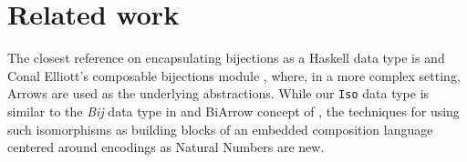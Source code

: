 \documentclass[]{INCLUDES/llncs}
\begin{document}
\begin{comment}
Assuming morphisms are given by their positions {\tt m1} and {\tt m2} in the
multidigraph (sequence of pairs) representing the category {\tt c} encoded by
natural number {\tt n} we can define:
\begin{code}
ncompose n m1 m2 = as nat nat2 m where 
  c=as mdigraph nat n
  m=pcompose (c!!m1) (c!!m2)
\end{code}
which works as follows:
\begin{codex}
*ISO> as mdigraph nat 1234567890
[(1,0),(0,1),(1,0),(0,0),(1,0),(3,1),
 (0,0),(1,0),(0,1),(0,0),(0,1),(0,1)]
*ISO> pcompose (3,1) (1,0)
(3,0)
*ISO> ncompose 1234567890 5 2
5
*ISO> ncompose 1234567890 2 5
*** Exception: pcompose: bad morphisms
\end{codex}
The function {\tt trans} computes the irreflexive transitive closure of a
digraph while {\tt rtrans} adds identity pairs to it.
\begin{code}
rtrans ps = (ids ps) ++ (trans ps)

trans ps = sort $ nub $ trans2 ps where

  trans1 ps = nub [q|q<-qs,not (is_id q)] where
     is_id (x,y) = x==y 
     qs=ps++[pcompose p q|p<-ps,q<-ps,is_pcomposable p q]

  trans2 ps = if (l==l1) then ps else (trans2 ps1) where
    l=genericLength ps 
    ps1=trans1 ps
    l1=genericLength ps1
\end{code}
It works as follows:
\begin{codex}
*ISO> trans [(0,1),(1,2),(2,3)]
[(0,1),(0,2),(0,3),(1,2),(1,3),(2,3)]
*ISO> trans [(0,1),(1,2),(2,0)]
[(0,1),(0,2),(1,0),(1,2),(2,0),(2,1)]
*ISO> rtrans [(0,1),(1,2)]
[(0,0),(1,1),(2,2),(0,1),(0,2),(1,2)]
\end{codex}

\begin{code}
to_trans n = trans $ as digraph nat n

ntrans n = as nat digraph $ to_trans n

vertset ps = sort $ nub [z|(x,y)<-ps,z<-[x,y]]

ids ps = [(x,x)|x<-vertset ps]

pairs2graph ps = l where
  l=genericLength ps
  
gtest = map f (vertices x) where 
  (x,f,z)=graphFromEdges [(0,10,[10,20]),(1,10,[20]),(2,20,[10])]
  
\end{code}
\end{comment}

\section{Related work} \label{related}
The closest reference on encapsulating bijections
as a Haskell data type is \cite{bijarrows} 
and Conal Elliott's composable
bijections module \cite{bijeliot},
where, in a more complex setting,
Arrows \cite{hughes:arrows} are used 
as the underlying abstractions.
While our {\tt Iso} data type is similar
to the {\em Bij} data type in \cite{bijeliot} and
BiArrow concept of \cite{bijarrows},
the techniques for using such isomorphisms
as building blocks of an embedded composition
language centered around encodings
as Natural Numbers are new.
\end{document}
